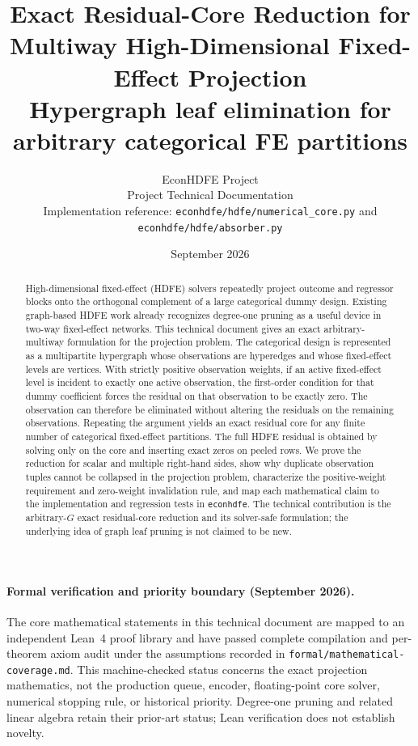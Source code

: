 \documentclass[11pt]{article}
\title{\textbf{Exact Residual-Core Reduction for Multiway High-Dimensional Fixed-Effect Projection}\\
\large Hypergraph leaf elimination for arbitrary categorical FE partitions}
\author{EconHDFE Project\\[2pt]\small Project Technical Documentation\\[2pt]\small Implementation reference: \texttt{econhdfe/hdfe/numerical\_core.py} and \texttt{econhdfe/hdfe/absorber.py}}
\date{September 2026}
\theoremstyle{definition}
\newcommand{\1}{\mathbf{1}}
\begin{document}
\maketitle

\begin{abstract}
High-dimensional fixed-effect (HDFE) solvers repeatedly project outcome and regressor blocks onto the orthogonal complement of a large categorical dummy design. Existing graph-based HDFE work already recognizes degree-one pruning as a useful device in two-way fixed-effect networks. This technical document gives an exact arbitrary-multiway formulation for the projection problem. The categorical design is represented as a multipartite hypergraph whose observations are hyperedges and whose fixed-effect levels are vertices. With strictly positive observation weights, if an active fixed-effect level is incident to exactly one active observation, the first-order condition for that dummy coefficient forces the residual on that observation to be exactly zero. The observation can therefore be eliminated without altering the residuals on the remaining observations. Repeating the argument yields an exact residual core for any finite number of categorical fixed-effect partitions. The full HDFE residual is obtained by solving only on the core and inserting exact zeros on peeled rows. We prove the reduction for scalar and multiple right-hand sides, show why duplicate observation tuples cannot be collapsed in the projection problem, characterize the positive-weight requirement and zero-weight invalidation rule, and map each mathematical claim to the implementation and regression tests in \texttt{econhdfe}. The technical contribution is the arbitrary-$G$ exact residual-core reduction and its solver-safe formulation; the underlying idea of graph leaf pruning is not claimed to be new.
\end{abstract}

\paragraph{Formal verification and priority boundary (September 2026).}
The core mathematical statements in this technical document are mapped to an independent
Lean~4 proof library and have passed complete compilation and per-theorem axiom
audit under the assumptions recorded in
\texttt{formal/mathematical-coverage.md}. This machine-checked status concerns
the exact projection mathematics, not the production queue, encoder,
floating-point core solver, numerical stopping rule, or historical priority.
Degree-one pruning and related linear algebra retain their prior-art status;
Lean verification does not establish novelty.
\end{document}
